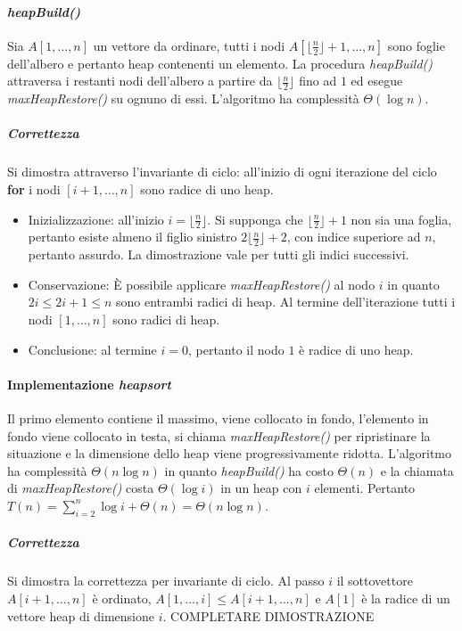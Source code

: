 \paragraph{\emph{heapBuild()}}
Sia $A[1,\dots, n]$ un vettore da ordinare, tutti i nodi $A[\lfloor \frac{n}{2}\rfloor+1,\dots, n]$ sono foglie dell'albero e pertanto heap contenenti un 
elemento. La procedura \emph{heapBuild()} attraversa i restanti nodi dell'albero a partire da $\lfloor \frac{n}{2}\rfloor$ fino ad $1$ ed esegue 
\emph{maxHeapRestore()} su ognuno di essi. L'algoritmo ha complessit\`a $\Theta(\log n)$. 

\subparagraph{Correttezza}
Si dimostra attraverso l'invariante di ciclo: all'inizio di ogni iterazione del ciclo \textbf{for} i nodi $[i+1,\dots, n]$ sono radice di uno heap.
\begin{itemize}
\item Inizializzazione: all'inizio $i=\lfloor \frac{n}{2}\rfloor$. Si supponga che $\lfloor \frac{n}{2}\rfloor+1$ non sia una foglia, pertanto esiste almeno
il figlio sinistro $2\lfloor \frac{n}{2}\rfloor+2$, con indice superiore ad $n$, pertanto assurdo. La dimostrazione vale per tutti gli indici successivi.
\item Conservazione: \`E possibile applicare \emph{maxHeapRestore()} al nodo $i$ in quanto $2i\le 2i+1\le n$ sono entrambi radici di heap. Al termine 
dell'iterazione tutti i nodi $[1,\dots, n]$ sono radici di heap.
\item Conclusione: al termine $i=0$, pertanto il nodo $1$ \`e radice di uno heap. 
\end{itemize}
\paragraph{Implementazione \emph{heapsort}}
Il primo elemento contiene il massimo, viene collocato in fondo, l'elemento in fondo viene collocato in testa, si chiama \emph{maxHeapRestore()} per 
ripristinare la situazione e la dimensione dello heap viene progressivamente ridotta. L'algoritmo ha complessit\`a $\Theta(n\log n)$ in quanto 
\emph{heapBuild()} ha costo $\Theta(n)$ e la chiamata di \emph{maxHeapRestore()} costa $\Theta(\log i)$ in un heap con $i$ elementi. Pertanto 
$T(n)=\sum\limits_{i=2}^n\log i+\Theta(n)=\Theta(n\log n)$.

\subparagraph{Correttezza}
Si dimostra la correttezza per invariante di ciclo. Al passo $i$ il sottovettore $A[i+1,\dots, n]$ \`e ordinato, $A[1,\dots, i]\le A[i+1, \dots, n]$ e 
$A[1]$ \`e la radice di un vettore heap di dimensione $i$. COMPLETARE DIMOSTRAZIONE
